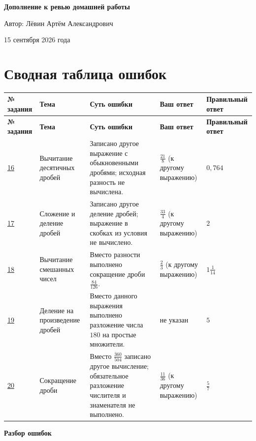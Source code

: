 \documentclass[12pt,a4paper]{article}
\begin{document}
\begin{titlepage}
\centering
\vspace*{0.22\textheight}
{\LARGE\bfseries Дополнение к ревью домашней работы\par}
\vspace{2.2cm}
{\large Автор: Лёвин Артём Александрович\par}
\vspace{0.8cm}
{\large 15 сентября 2026 года\par}
\vfill
{}
\vspace{0.8cm}
\end{titlepage}
\newpage
\section*{Сводная таблица ошибок}
{\small
\setlength{\tabcolsep}{3pt}
\begin{longtable}{@{}L{1.5cm}L{2.8cm}L{4.9cm}L{2.3cm}L{2.6cm}@{}}
\toprule
\textbf{№ задания}&\textbf{Тема}&\textbf{Суть ошибки}&\textbf{Ваш ответ}&\textbf{Правильный ответ}\\
\midrule
\endfirsthead
\toprule
\textbf{№ задания}&\textbf{Тема}&\textbf{Суть ошибки}&\textbf{Ваш ответ}&\textbf{Правильный ответ}\\
\midrule
\endhead
\hyperref[task:16]{16}&Вычитание десятичных дробей&Записано другое выражение с обыкновенными дробями; исходная разность не вычислена.&$\frac{21}{8}$ (к другому выражению)&$0{,}764$\\[0.4em]
\hyperref[task:17]{17}&Сложение и деление дробей&Записано другое деление дробей; выражение в скобках из условия не вычислено.&$\frac{33}{4}$ (к другому выражению)&$2$\\[0.4em]
\hyperref[task:18]{18}&Вычитание смешанных чисел&Вместо разности выполнено сокращение дроби $\frac{84}{126}$.&$\frac23$ (к другому выражению)&$1\frac1{14}$\\[0.4em]
\hyperref[task:19]{19}&Деление на произведение дробей&Вместо данного выражения выполнено разложение числа $180$ на простые множители.&не указан&$5$\\[0.4em]
\hyperref[task:20]{20}&Сокращение дроби&Вместо $\frac{360}{504}$ записано другое вычисление; обязательное разложение числителя и знаменателя не выполнено.&$\frac{11}{36}$ (к другому выражению)&$\frac57$\\
\bottomrule
\end{longtable}}
\newpage
\thispagestyle{empty}
\vspace*{\fill}
\begin{center}{\LARGE\bfseries Разбор ошибок}\end{center}
\vspace*{\fill}
\newpage
{}
\label{task:16}
\end{document}
